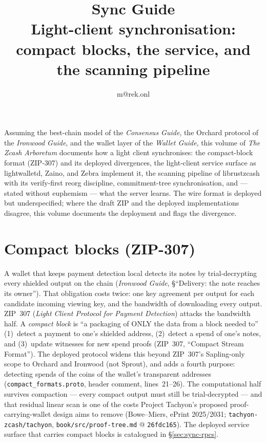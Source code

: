 \documentclass[11pt,a4paper]{article}
\title{\textbf{\Huge Sync Guide}\\[6pt]\large Light-client synchronisation: compact blocks, the service, and the scanning pipeline}
\author{m@rek.onl}
\date{}
\theoremstyle{definition}
\renewenvironment{abstract}{%
  \small\begin{center}{\bfseries\abstractname}\end{center}\medskip\noindent\ignorespaces
}{\par\medskip}
\begin{document}
\maketitle
\thispagestyle{empty}
\begin{abstract}
Assuming the best-chain model of the \emph{Consensus Guide}, the Orchard
protocol of the \emph{Ironwood Guide}, and the wallet layer of the
\emph{Wallet Guide}, this volume of \emph{The Zcash Arboretum} documents how a
light client synchronises: the compact-block format (ZIP-307)
and its deployed divergences, the light-client service surface as lightwalletd,
Zaino, and Zebra implement it, the scanning pipeline of
\textsf{librustzcash} with its verify-first reorg discipline, commitment-tree
synchronisation, and --- stated without euphemism --- what the server learns.
The
wire format is deployed but underspecified; where the draft ZIP and the
deployed implementations disagree, this volume documents the deployment and
flags the divergence.
\end{abstract}
\clearpage
\tableofcontents
\clearpage
\section{Compact blocks (ZIP-307)}\label{sec:sync-compact}

A wallet that keeps payment detection local detects its notes by trial-decrypting every
shielded output on the chain (\emph{Ironwood Guide}, \S``Delivery: the note
reaches its owner'').
That obligation costs twice: one key agreement per output for each candidate
incoming viewing key, and
the bandwidth of downloading every output. ZIP~307 (\emph{Light Client
Protocol for Payment Detection}) attacks the bandwidth half. A \emph{compact
block} is ``a packaging of ONLY the data from a block needed to'' (1)~detect
a payment to one's shielded address, (2)~detect a spend of one's notes, and
(3)~update witnesses for new spend proofs (ZIP~307, ``Compact Stream
Format''). The deployed protocol widens this beyond ZIP~307's Sapling-only
scope to Orchard and Ironwood (not Sprout), and adds a fourth purpose: detecting spends of
the coins of the wallet's transparent addresses
(\texttt{compact\_formats.proto}, header comment, lines~21--26). The
computational half survives compaction --- every compact output must still be
trial-decrypted --- and that residual linear scan is one of the costs Project
Tachyon's proposed proof-carrying-wallet design aims to remove (Bowe--Miers,
ePrint 2025/2031; \texttt{tachyon-zcash/tachyon},
\texttt{book/src/proof-tree.md} @ \texttt{26fdc165}). The deployed service
surface that carries compact blocks is catalogued in
\S\ref{sec:sync-rpcs}.
\end{document}
